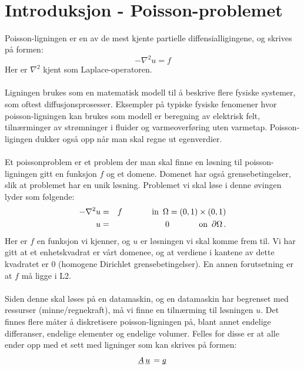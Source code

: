 \documentclass{article}
\title{
\vspace*{\stretch{1}}
\noindent\HRule
\begin{center}
 \Huge
 \noindent	\exerciseClass \\
 \noindent \exerciseTitle \\ [4mm]
 \large
 \noindent\emph{\exerciseGroupMembers}
\noindent\HRule \newline
\end{center}
\vspace{0cm}
\begin{center}
\end{center}
\vspace*{\stretch{3}}
\begin{center}
\end{center}
}
\newcommand{\ub}[1]{\underbar{$#1$}\,}
\begin{document}
\pagestyle{empty}
\maketitle

\thispagestyle{empty}

\newpage \tableofcontents


\newpage


\section{Introduksjon - Poisson-problemet}
Poisson-ligningen er en av de mest kjente partielle diffensialligingene, og skrives på formen:
\begin{equation}
	-\nabla^2 u = f
\end{equation}
Her er $\nabla^2$ kjent som Laplace-operatoren.\\
\\
Ligningen brukes som en matematisk modell til å beskrive flere fysiske systemer, som oftest diffusjonsprosesser. Eksempler på typiske fysiske fenomener hvor poisson-ligningen kan brukes som modell er beregning av elektrisk felt, tilnærminger av strømninger i fluider og varmeoverføring uten varmetap. Poisson-ligingen dukker også opp når man skal regne ut egenverdier.\\
\\
Et poissonproblem er et problem der man skal finne en løsning til poisson-ligningen gitt en funksjon $f$ og et domene. Domenet har også grensebetingelser, slik at problemet har en unik løsning. Problemet vi skal løse i denne øvingen lyder som følgende:
\begin{eqnarray}
	-\nabla^2 u & = & f \hspace{.5in} \textrm{in} \,\,\, \Omega = (0,1)\times (0,1) \\
	u & = & 0 \hspace{.5in} \textrm{on} \,\,\, \partial\Omega\, .
\end{eqnarray}
Her er $f$ en funksjon vi kjenner,  og $u$ er løsningen vi skal komme frem til. Vi har gitt at et enhetskvadrat  er vårt domenee, og at verdiene i kantene av dette kvadratet er $0$ (homogene Dirichlet grensebetingelser). En annen forutsetning er at $f$ må ligge i L2.\\
\\
Siden denne skal løses på en datamaskin, og en datamaskin har begrenset med ressurser (minne/regnekraft), må vi finne en tilnærming til løsningen $u$. Det finnes flere måter å diskretisere poisson-ligningen på, blant annet endelige differanser, endelige elementer og endelige volumer. Felles for disse er at alle ender opp med et sett med ligninger som kan skrives på formen:
\begin{equation}
	\label{eq:linear-system}
  \ub{A} \ub{u} = \ub{g}
\end{equation}
\end{document}
